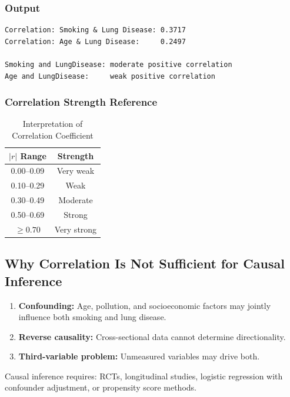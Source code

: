 \documentclass[12pt,a4paper]{article}
\begin{document}
\subsubsection{Output}

\begin{lstlisting}[style=outputstyle]
Correlation: Smoking & Lung Disease: 0.3717
Correlation: Age & Lung Disease:     0.2497

Smoking and LungDisease: moderate positive correlation
Age and LungDisease:     weak positive correlation
\end{lstlisting}

\subsubsection{Correlation Strength Reference}

\begin{table}[H]
  \centering
  \caption{Interpretation of Correlation Coefficient}
  \begin{tabular}{cc}
    \toprule
    \textbf{$|r|$ Range} & \textbf{Strength} \\
    \midrule
    0.00--0.09 & Very weak \\
    0.10--0.29 & Weak \\
    0.30--0.49 & Moderate \\
    0.50--0.69 & Strong \\
    $\geq 0.70$ & Very strong \\
    \bottomrule
  \end{tabular}
\end{table}

\subsection{Why Correlation Is Not Sufficient for Causal Inference}

\begin{enumerate}[leftmargin=*]
  \item \textbf{Confounding:} Age, pollution, and socioeconomic factors may jointly influence both smoking and lung disease.
  \item \textbf{Reverse causality:} Cross-sectional data cannot determine directionality.
  \item \textbf{Third-variable problem:} Unmeasured variables may drive both.
\end{enumerate}

Causal inference requires: RCTs, longitudinal studies, logistic regression with confounder adjustment, or propensity score methods.
\end{document}

